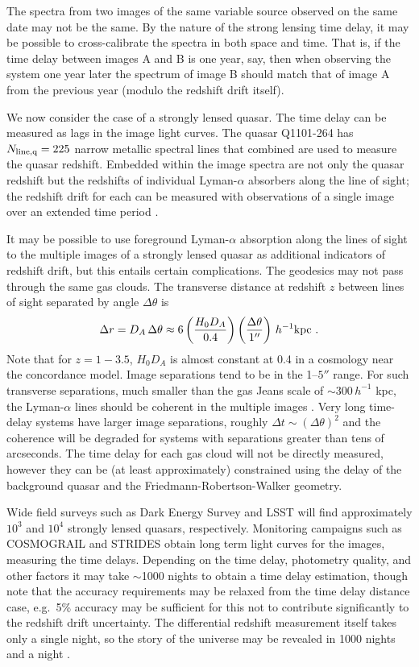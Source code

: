\documentclass[preprint2, 10pt]{aastex}
\newcommand{\be}{\begin{equation}}
\newcommand{\ee}{\end{equation}}
\begin{document}
{The spectra from two images of the same variable source observed on the same date
may not be the same.  
By the nature of the strong lensing time delay, it may be possible 
to cross-calibrate the spectra in both space and time.  That is, if the time 
delay between images A and B is one year, say, then when observing the system 
one year later the spectrum of image B should match that of image A from 
the previous year (modulo the redshift drift itself). 

We now consider the case of a strongly lensed quasar.  The time delay can
be measured as lags in the image light curves.  The quasar Q1101-264  has
$N_{\rm line,q} =225$ narrow metallic spectral lines 
\citep{2008MNRAS.386.1192L} that combined are used to measure the quasar
redshift.  Embedded within the image spectra are not only the quasar redshift but 
the redshifts of individual Lyman-$\alpha$ absorbers along the line of sight; the redshift drift for each can
be measured 
with observations of a single image
over an extended time period
\citep{1998ApJ...499L.111L,2008MNRAS.386.1192L}.

It may be possible to use 
foreground Lyman-$\alpha$ absorption along the lines of sight to the multiple images 
of a strongly lensed quasar as additional indicators of redshift drift, 
but this entails certain complications.
The geodesics may not pass through the same gas clouds.
The transverse distance at redshift $z$ between 
lines of sight separated by angle $\Delta\theta$ is 
\be 
\Delta r=D_A\,\Delta\theta\approx 
6\left(\frac{H_0D_A}{0.4}\right)\left(\frac{\Delta\theta}{1''}\right)\, 
h^{-1}{\rm kpc} \ . 
\ee 
Note that for $z=1-3.5$, $H_0D_A$ is almost constant at 0.4 in a 
cosmology near the concordance model.  Image separations tend to be in 
the 1--$5''$ range.  For such transverse separations, much smaller than 
the gas Jeans scale of $\sim300\,h^{-1}$ kpc, the Lyman-$\alpha$ lines 
should be coherent in the multiple images \citep{09100250}.  
Very long time-delay systems have larger image separations, roughly 
$\Delta t\sim(\Delta\theta)^2$ and the coherence will be degraded for 
systems with separations greater than tens of arcseconds. 
The time delay for each gas cloud will not be directly measured, however they
can be (at least approximately) constrained using the delay
of the background quasar and the Friedmann-Robertson-Walker geometry. 

Wide field surveys such as Dark Energy Survey and LSST will find 
approximately $10^3$ and $10^4$ strongly lensed quasars, respectively.  
Monitoring 
campaigns such as COSMOGRAIL \citep{cosmograil} and STRIDES \citep{strides} 
obtain long term light curves for the images, measuring the time 
delays.  Depending on the time delay, photometry quality, and other 
factors it may take $\sim$1000 nights to obtain a time delay 
estimation, though note that the accuracy requirements may be relaxed 
from the time delay distance case, e.g.\ 5\% accuracy may be sufficient 
for this not to contribute significantly to the redshift drift uncertainty. 
The differential redshift measurement itself takes only a single night, 
so the story of the universe may be revealed in 1000 nights and a night 
\citep{1001}. 


}
\end{document}
